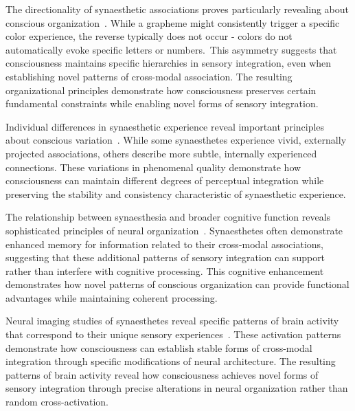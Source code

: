 The directionality of synaesthetic associations proves particularly revealing about conscious organization~\cite{Eagleman2009, da2024mathematical}. While a grapheme might consistently trigger a specific color experience, the reverse typically does not occur - colors do not automatically evoke specific letters or numbers.~This asymmetry suggests that consciousness maintains specific hierarchies in sensory integration, even when establishing novel patterns of cross-modal association. The resulting organizational principles demonstrate how consciousness preserves certain fundamental constraints while enabling novel forms of sensory integration.

Individual differences in synaesthetic experience reveal important principles about conscious variation~\cite{Dixon2004, butlin2023consciousnessartificialintelligenceinsights}. While some synaesthetes experience vivid, externally projected associations, others describe more subtle, internally experienced connections. These variations in phenomenal quality demonstrate how consciousness can maintain different degrees of perceptual integration while preserving the stability and consistency characteristic of synaesthetic experience.

The relationship between synaesthesia and broader cognitive function reveals sophisticated principles of neural organization~\cite{Kadosh2007, pinotsis2023vivo}. Synaesthetes often demonstrate enhanced memory for information related to their cross-modal associations, suggesting that these additional patterns of sensory integration can support rather than interfere with cognitive processing. This cognitive enhancement demonstrates how novel patterns of conscious organization can provide functional advantages while maintaining coherent processing.

Neural imaging studies of synaesthetes reveal specific patterns of brain activity that correspond to their unique sensory experiences~\cite{Nunn2002, bosl2025dynamical}. These activation patterns demonstrate how consciousness can establish stable forms of cross-modal integration through specific modifications of neural architecture. The resulting patterns of brain activity reveal how consciousness achieves novel forms of sensory integration through precise alterations in neural organization rather than random cross-activation.

